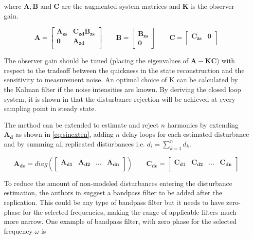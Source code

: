 where $\mathbf{A, B}$ and $\mathbf{C}$ are the augmented system matrices and $\mathbf{K}$ is the observer gain.

\begin{equation}
  \label{eq:augumented}
  \mathbf{A} =
    \begin{bmatrix}
       \mathbf{A_{zs}} & \mathbf{C_{zd}B_{zs}}\\[0.3em]
       \mathbf{0} & \mathbf{A_{zd}}\\
     \end{bmatrix}
     \qquad
  \mathbf{B} =
    \begin{bmatrix}
        \mathbf{B_{zs}}\\
        \mathbf{0}
    \end{bmatrix}
     \qquad
  \mathbf{C} =
    \begin{bmatrix}
        \mathbf{C_{zs}} & \mathbf{0}\\
    \end{bmatrix}
\end{equation}

The observer gain should be tuned (placing the eigenvalues of $\mathbf{A-KC}$) with respect to the tradeoff between the quickness in the state reconstruction and the sensitivity to measurement noise. An optimal choice of K can be calculated by the Kalman filter if the noise intensities are known. By deriving the closed loop system, it is shown in \citep{fujimoto2004repetitive} that the disturbance rejection will be achieved at every sampling point in steady state.

The method can be extended to estimate and reject $n$ harmonics by extending $\mathbf{A_d}$ as shown in \eqref{eq:sinexten}, adding $n$ delay loops for each estimated disturbance and by summing all replicated disturbances i.e. $d_i = \sum_{k=1}^{n} d_k$.

\begin{equation}
  \label{eq:sinexten}
  \mathbf{A_{de}} =
    diag(\begin{bmatrix}
      \mathbf{A_{d1}}  &  \mathbf{A_{d2}} & \hdots & \mathbf{A_{dn}} \\
     \end{bmatrix})
     \qquad
  \mathbf{C_{de}} =
    \begin{bmatrix}
       \mathbf{C_{d1}}  &  \mathbf{C_{d2}} & \hdots & \mathbf{C_{dn}} \\
    \end{bmatrix}
\end{equation}

To reduce the amount of non-modeled disturbances entering the disturbance estimation, the authors in \citep{fujimoto2004repetitive} suggest a bandpass filter to be added after the replication. This could be any type of bandpass filter but it needs to have zero-phase for the selected frequencies, making the range of applicable filters much more narrow. One example of bandpass filter, with zero phase for the selected frequency $\omega$ is

